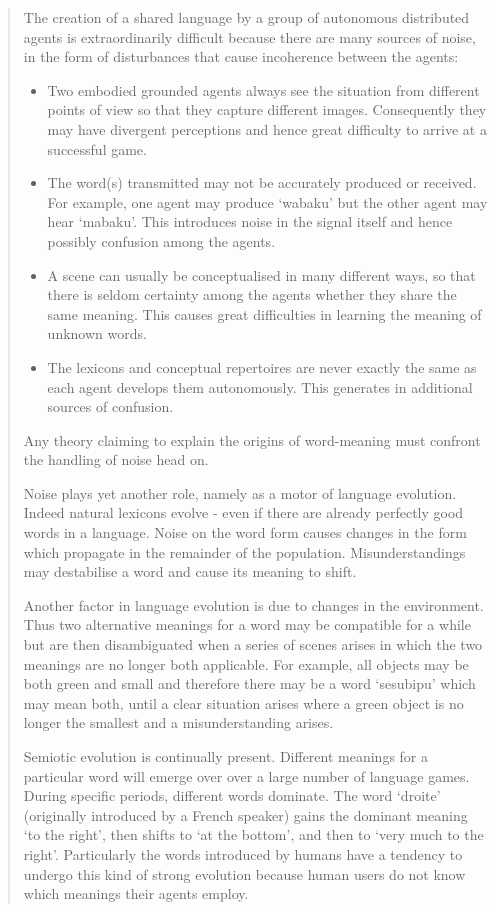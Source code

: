 \begin{quotation}
The creation of a shared language by a group of autonomous distributed agents is extraordinarily difficult because there are many sources of noise, in the form of disturbances that cause incoherence between the agents:

\begin{itemize} 
\item Two embodied grounded agents always see the situation from different points of view so that they capture different images. Consequently they may have divergent perceptions and hence great difficulty to arrive at a successful game. 
\item The word(s) transmitted may not be accurately produced or received. For example, one agent may produce `wabaku' but the other agent may hear `mabaku'. This introduces noise in the signal itself and hence possibly confusion among the agents. 
\item A scene can usually be conceptualised in many different ways, so that there is seldom certainty among the agents whether they share the same meaning. This causes great difficulties in learning the meaning of unknown words. 
\item The lexicons and conceptual repertoires are never exactly the same as each agent develops them autonomously. This generates in additional sources of confusion.
\end{itemize} 

Any theory claiming to explain the origins of word-meaning must confront the handling of noise head on.

Noise plays yet another role, namely as a motor of language evolution. Indeed natural lexicons evolve - even if there are already perfectly good words in a language. Noise on the word form causes changes in the form which propagate in the remainder of the population. Misunderstandings may destabilise a word and cause its meaning to shift.

Another factor in language evolution is due to changes in the environment. Thus two alternative meanings for a word may be compatible for a while but are then disambiguated when a series of scenes arises in which the two meanings are no longer both applicable. For example, all objects may be both green and small and therefore there may be a word `sesubipu' which may mean both, until a clear situation arises where a green object is no longer the smallest and a misunderstanding arises.

Semiotic evolution is continually present. Different meanings for a particular word will emerge over over a large number of language games. During specific periods, different words dominate. The word `droite' (originally introduced by a French speaker) gains the dominant meaning `to the right', then shifts to `at the bottom', and then to `very much to the right'. Particularly the words introduced by humans have a tendency to undergo this kind of strong evolution because human users do not know which meanings their agents employ.


\end{quotation}
